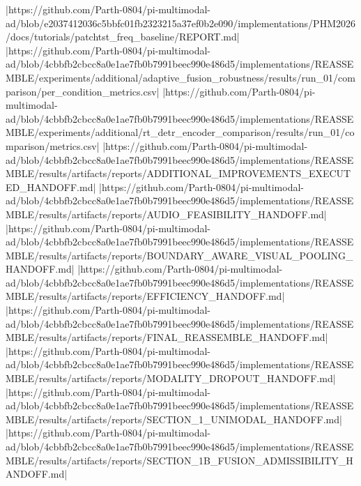 |https://github.com/Parth-0804/pi-multimodal-ad/blob/e2037412036c5bbfc01fb2323215a37ef0b2e090/implementations/PHM2026/docs/tutorials/patchtst_freq_baseline/REPORT.md|
|https://github.com/Parth-0804/pi-multimodal-ad/blob/4cbbfb2cbcc8a0e1ae7fb0b7991beec990e486d5/implementations/REASSEMBLE/experiments/additional/adaptive_fusion_robustness/results/run_01/comparison/per_condition_metrics.csv|
|https://github.com/Parth-0804/pi-multimodal-ad/blob/4cbbfb2cbcc8a0e1ae7fb0b7991beec990e486d5/implementations/REASSEMBLE/experiments/additional/rt_detr_encoder_comparison/results/run_01/comparison/metrics.csv|
|https://github.com/Parth-0804/pi-multimodal-ad/blob/4cbbfb2cbcc8a0e1ae7fb0b7991beec990e486d5/implementations/REASSEMBLE/results/artifacts/reports/ADDITIONAL_IMPROVEMENTS_EXECUTED_HANDOFF.md|
|https://github.com/Parth-0804/pi-multimodal-ad/blob/4cbbfb2cbcc8a0e1ae7fb0b7991beec990e486d5/implementations/REASSEMBLE/results/artifacts/reports/AUDIO_FEASIBILITY_HANDOFF.md|
|https://github.com/Parth-0804/pi-multimodal-ad/blob/4cbbfb2cbcc8a0e1ae7fb0b7991beec990e486d5/implementations/REASSEMBLE/results/artifacts/reports/BOUNDARY_AWARE_VISUAL_POOLING_HANDOFF.md|
|https://github.com/Parth-0804/pi-multimodal-ad/blob/4cbbfb2cbcc8a0e1ae7fb0b7991beec990e486d5/implementations/REASSEMBLE/results/artifacts/reports/EFFICIENCY_HANDOFF.md|
|https://github.com/Parth-0804/pi-multimodal-ad/blob/4cbbfb2cbcc8a0e1ae7fb0b7991beec990e486d5/implementations/REASSEMBLE/results/artifacts/reports/FINAL_REASSEMBLE_HANDOFF.md|
|https://github.com/Parth-0804/pi-multimodal-ad/blob/4cbbfb2cbcc8a0e1ae7fb0b7991beec990e486d5/implementations/REASSEMBLE/results/artifacts/reports/MODALITY_DROPOUT_HANDOFF.md|
|https://github.com/Parth-0804/pi-multimodal-ad/blob/4cbbfb2cbcc8a0e1ae7fb0b7991beec990e486d5/implementations/REASSEMBLE/results/artifacts/reports/SECTION_1_UNIMODAL_HANDOFF.md|
|https://github.com/Parth-0804/pi-multimodal-ad/blob/4cbbfb2cbcc8a0e1ae7fb0b7991beec990e486d5/implementations/REASSEMBLE/results/artifacts/reports/SECTION_1B_FUSION_ADMISSIBILITY_HANDOFF.md|
